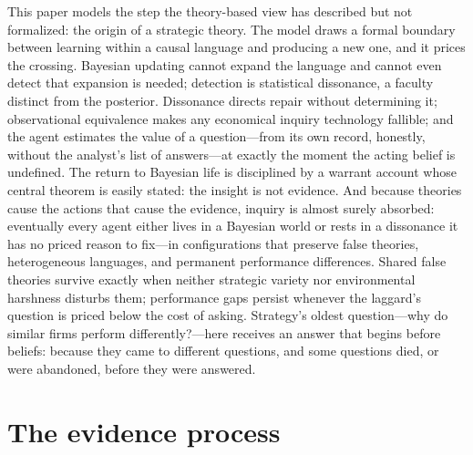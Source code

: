 \documentclass[11pt]{article}
\theoremstyle{definition}
\begin{document}
This paper models the step the theory-based view has described but not formalized: the origin of a strategic theory.
The model draws a formal boundary between learning within a causal language and producing a new one, and it prices the crossing.
Bayesian updating cannot expand the language and cannot even detect that expansion is needed; detection is statistical dissonance, a faculty distinct from the posterior.
Dissonance directs repair without determining it; observational equivalence makes any economical inquiry technology fallible; and the agent estimates the value of a question---from its own record, honestly, without the analyst's list of answers---at exactly the moment the acting belief is undefined.
The return to Bayesian life is disciplined by a warrant account whose central theorem is easily stated: the insight is not evidence.
And because theories cause the actions that cause the evidence, inquiry is almost surely absorbed: eventually every agent either lives in a Bayesian world or rests in a dissonance it has no priced reason to fix---in configurations that preserve false theories, heterogeneous languages, and permanent performance differences.
Shared false theories survive exactly when neither strategic variety nor environmental harshness disturbs them; performance gaps persist whenever the laggard's question is priced below the cost of asking.
Strategy's oldest question---why do similar firms perform differently?---here receives an answer that begins before beliefs: because they came to different questions, and some questions died, or were abandoned, before they were answered.




\appendix
\section{The evidence process}
\label{app:eprocess}
\end{document}
